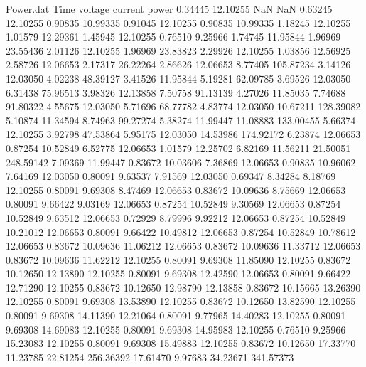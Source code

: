 \begin{filecontents}{Power.dat}
Time voltage current power
   0.34445   12.10255        NaN        NaN
   0.63245   12.10255    0.90835   10.99335
   0.91045   12.10255    0.90835   10.99335
   1.18245   12.10255    1.01579   12.29361
   1.45945   12.10255    0.76510    9.25966
   1.74745   11.95844    1.96969   23.55436
   2.01126   12.10255    1.96969   23.83823
   2.29926   12.10255    1.03856   12.56925
   2.58726   12.06653    2.17317   26.22264
   2.86626   12.06653    8.77405  105.87234
   3.14126   12.03050    4.02238   48.39127
   3.41526   11.95844    5.19281   62.09785
   3.69526   12.03050    6.31438   75.96513
   3.98326   12.13858    7.50758   91.13139
   4.27026   11.85035    7.74688   91.80322
   4.55675   12.03050    5.71696   68.77782
   4.83774   12.03050   10.67211  128.39082
   5.10874   11.34594    8.74963   99.27274
   5.38274   11.99447   11.08883  133.00455
   5.66374   12.10255    3.92798   47.53864
   5.95175   12.03050   14.53986  174.92172
   6.23874   12.06653    0.87254   10.52849
   6.52775   12.06653    1.01579   12.25702
   6.82169   11.56211   21.50051  248.59142
   7.09369   11.99447    0.83672   10.03606
   7.36869   12.06653    0.90835   10.96062
   7.64169   12.03050    0.80091    9.63537
   7.91569   12.03050    0.69347    8.34284
   8.18769   12.10255    0.80091    9.69308
   8.47469   12.06653    0.83672   10.09636
   8.75669   12.06653    0.80091    9.66422
   9.03169   12.06653    0.87254   10.52849
   9.30569   12.06653    0.87254   10.52849
   9.63512   12.06653    0.72929    8.79996
   9.92212   12.06653    0.87254   10.52849
  10.21012   12.06653    0.80091    9.66422
  10.49812   12.06653    0.87254   10.52849
  10.78612   12.06653    0.83672   10.09636
  11.06212   12.06653    0.83672   10.09636
  11.33712   12.06653    0.83672   10.09636
  11.62212   12.10255    0.80091    9.69308
  11.85090   12.10255    0.83672   10.12650
  12.13890   12.10255    0.80091    9.69308
  12.42590   12.06653    0.80091    9.66422
  12.71290   12.10255    0.83672   10.12650
  12.98790   12.13858    0.83672   10.15665
  13.26390   12.10255    0.80091    9.69308
  13.53890   12.10255    0.83672   10.12650
  13.82590   12.10255    0.80091    9.69308
  14.11390   12.21064    0.80091    9.77965
  14.40283   12.10255    0.80091    9.69308
  14.69083   12.10255    0.80091    9.69308
  14.95983   12.10255    0.76510    9.25966
  15.23083   12.10255    0.80091    9.69308
  15.49883   12.10255    0.83672   10.12650
  17.33770   11.23785   22.81254  256.36392
  17.61470    9.97683   34.23671  341.57373

\end{filecontents}
